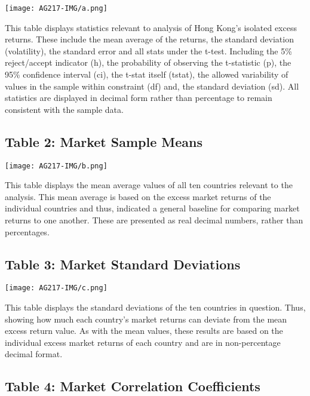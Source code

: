 \documentclass[11pt, english]{article}
\begin{document}
	\begin{center}
                \texttt{[image: AG217-IMG/a.png]}
        \end{center}

	This table displays statistics relevant to analysis of Hong Kong's isolated excess returns. These include the mean average of the returns, the standard deviation (volatility), the standard error and all stats under the t-test. Including the 5\% reject/accept indicator (h), the probability of observing the t-statistic (p), the 95\% confidence interval (ci), the t-stat itself (tstat), the allowed variability of values in the sample within constraint (df) and, the standard deviation (sd). All statistics are displayed in decimal form rather than percentage to remain consistent with the sample data. 

	\subsection{Table 2: Market Sample Means}

	\begin{center}
                \texttt{[image: AG217-IMG/b.png]}    
        \end{center}

	This table displays the mean average values of all ten countries relevant to the analysis. This mean average is based on the excess market returns of the individual countries and thus, indicated a general baseline for comparing market returns to one another. These are presented as real decimal numbers, rather than percentages.

	\subsection{Table 3: Market Standard Deviations}

	\begin{center}
                \texttt{[image: AG217-IMG/c.png]}    
        \end{center}

	This table displays the standard deviations of the ten countries in question. Thus, showing how much each country's market returns can deviate from the mean excess return value. As with the mean values, these results are based on the individual excess market returns of each country and are in non-percentage decimal format.

	\subsection{Table 4: Market Correlation Coefficients}
\end{document}
